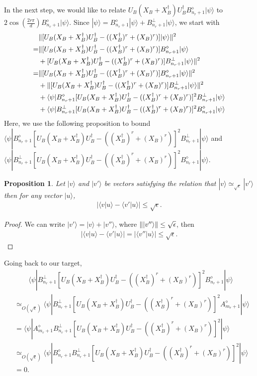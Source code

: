 \documentclass[11pt,letterpaper]{article}
\newcommand{\ket}[1]{|#1\rangle}
\newcommand{\bra}[1]{\langle#1|}
\newcommand{\braket}[2]{\langle#1|#2\rangle}
\newcommand{\ct}{^{\dagger}}
\DeclarePairedDelimiter{\norm}{\lVert}{\rVert}
\newcommand{\1}{\mathbb{1}}
\newcommand{\appd}[1]{\simeq_{#1}}
\newtheorem{proposition}[theorem]{Proposition}
\theoremstyle{definition}
\begin{document}
In the next step, we would like to 
relate $U_B(X_B+X_B\ct)U_B\ct B_{n_r+1}^\diamond \ket{\psi}$ to $2\cos(\frac{2r\pi}{d}) B_{n_r+1}^\diamond \ket{\psi}$.
Since $\ket{\psi} = B_{n_r+1}^\diamond \ket{\psi} + B_{n_r+1}^\perp \ket{\psi}$, we start with
\begin{align*}
	&\norm{[U_B(X_B+X_B\ct)U_B\ct - ((X_B\ct)^r+(X_B)^r)]\ket{\psi}}^2\\
	= &\norm{[U_B(X_B+X_B\ct)U_B\ct - ((X_B\ct)^r+(X_B)^r)]B_{n_r+1}^\diamond \ket{\psi}\\
	&+ [U_B(X_B+X_B\ct)U_B\ct - ((X_B\ct)^r+(X_B)^r)]B_{n_r+1}^\perp \ket{\psi}}^2\\
	=&\norm{[U_B(X_B+X_B\ct)U_B\ct - ((X_B\ct)^r+(X_B)^r)]B_{n_r+1}^\diamond \ket{\psi}}^2 \\
	&+\norm{[U_B(X_B+X_B\ct)U_B\ct - ((X_B\ct)^r+(X_B)^r)]B_{n_r+1}^\perp \ket{\psi}}^2 \\
	&+\bra{\psi} B_{n_r+1}^\diamond [U_B(X_B+X_B\ct)U_B\ct - ((X_B\ct)^r+(X_B)^r)]^2 B_{n_r+1}^\perp \ket{\psi}\\
	&+\bra{\psi} B_{n_r+1}^\perp [U_B(X_B+X_B\ct)U_B\ct - ((X_B\ct)^r+(X_B)^r)]^2 B_{n_r+1}^\diamond \ket{\psi}
\end{align*}
Here, we use the following proposition to bound $\bra{\psi} B_{n_r+1}^\diamond [U_B(X_B+X_B\ct)U_B\ct - ((X_B\ct)^r+(X_B)^r)]^2 B_{n_r+1}^\perp \ket{\psi}$ and $\bra{\psi} B_{n_r+1}^\perp [U_B(X_B+X_B\ct)U_B\ct - ((X_B\ct)^r+(X_B)^r)]^2 B_{n_r+1}^\diamond \ket{\psi}$.
\begin{proposition}
	Let $\ket{v}$ and $\ket{v'}$ be vectors satisfying the relation that $\ket{v} \appd{\sqrt{\epsilon}} \ket{v'}$
	then for any vector $\ket{u}$,
	\begin{align}
		| \braket{v}{u} - \braket{v'}{u} | \leq \sqrt{\epsilon}.
	\end{align}	
\end{proposition}
\begin{proof}
	We can write $\ket{v'} = \ket{v} + \ket{v''}$, where $\norm{\ket{v''}} \leq \sqrt{\epsilon}$,
	then
	\begin{align}
	| \braket{v}{u} - \braket{v'}{u} | = |\braket{v''}{u}| \leq \sqrt{\epsilon}.
	\end{align}
\end{proof}
Going back to our target,
\begin{align}
	&\qquad\bra{\psi} B_{n_r+1}^\perp [U_B(X_B+X_B\ct)U_B\ct - ((X_B\ct)^r+(X_B)^r)]^2 B_{n_r+1}^\diamond \ket{\psi} \\
	&\appd{O(\sqrt{\epsilon})} \bra{\psi} B_{n_r+1}^\perp [U_B(X_B+X_B\ct)U_B\ct - ((X_B\ct)^r+(X_B)^r)]^2 A_{m_r+1}^\diamond \ket{\psi} \\
	&=\bra{\psi} A_{m_r+1}^\diamond B_{n_r+1}^\perp[U_B(X_B+X_B\ct)U_B\ct - ((X_B\ct)^r+(X_B)^r)]^2 \ket{\psi}\\
	&\appd{O(\sqrt{\epsilon})} \bra{\psi} B_{n_r+1}^\diamond B_{n_r+1}^\perp[U_B(X_B+X_B\ct)U_B\ct - ((X_B\ct)^r+(X_B)^r)]^2 \ket{\psi}\\
	&= 0.
\end{align}
\end{document}
